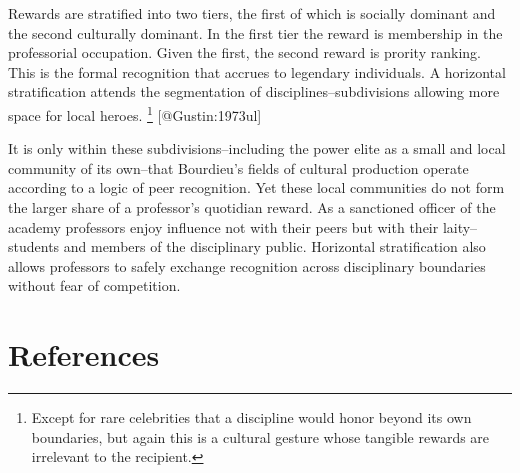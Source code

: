 \documentclass[]{article}
\let\rmarkdownfootnote\footnote%
\def\footnote{\protect\rmarkdownfootnote}
\begin{document}
Rewards are stratified into two tiers, the first of which is socially
dominant and the second culturally dominant. In the first tier the
reward is membership in the professorial occupation. Given the first,
the second reward is prority ranking. This is the formal recognition
that accrues to legendary individuals. A horizontal stratification
attends the segmentation of disciplines--subdivisions allowing more
space for local heroes. \footnote{Except for rare celebrities that a
  discipline would honor beyond its own boundaries, but again this is a
  cultural gesture whose tangible rewards are irrelevant to the
  recipient.} {[}@Gustin:1973ul{]}

It is only within these subdivisions--including the power elite as a
small and local community of its own--that Bourdieu's fields of cultural
production operate according to a logic of peer recognition. Yet these
local communities do not form the larger share of a professor's
quotidian reward. As a sanctioned officer of the academy professors
enjoy influence not with their peers but with their laity--students and
members of the disciplinary public. Horizontal stratification also
allows professors to safely exchange recognition across disciplinary
boundaries without fear of competition.

\section{References}\label{references}
\end{document}
